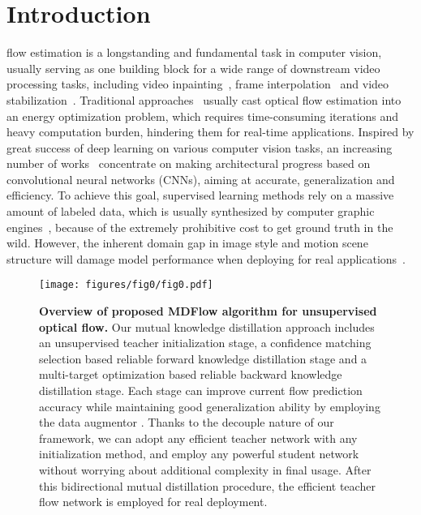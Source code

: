\documentclass[lettersize,journal]{IEEEtran}
\begin{document}
\section{Introduction}
 flow estimation is a longstanding and fundamental task in computer vision, usually serving as one building block for a wide range of downstream video processing tasks, including video inpainting~\cite{9241798}, frame interpolation~\cite{Kong_2022_CVPR,Liu_2022_ICIP} and video stabilization~\cite{7508986}. Traditional approaches~\cite{10.5555/888857,5206697,5539939,8434339} usually cast optical flow estimation into an energy optimization problem, which requires time-consuming iterations and heavy computation burden, hindering them for real-time applications. Inspired by great success of deep learning on various computer vision tasks, an increasing number of works~\cite{7410673,8099662,8579029,Hur:2019:IRR,teed2020raft,NEURIPS2020_add5aebf} concentrate on making architectural progress based on convolutional neural networks (CNNs), aiming at accurate, generalization and efficiency. To achieve this goal, supervised learning methods rely on a massive amount of labeled data, which is usually synthesized by computer graphic engines~\cite{7410673,7780807,humanflow}, because of the extremely prohibitive cost to get ground truth in the wild. However, the inherent domain gap in image style and motion scene structure will damage model performance when deploying for real applications~\cite{flowdata}.

\begin{figure}[t]
	\centering
	\vspace{2mm}
	\texttt{[image: figures/fig0/fig0.pdf]}
	\vspace{-1mm}
	\caption{\textbf{Overview of proposed MDFlow algorithm for unsupervised optical flow.} Our mutual knowledge distillation approach includes an unsupervised teacher initialization stage, a confidence matching selection based reliable forward knowledge distillation stage and a multi-target optimization based reliable backward knowledge distillation stage. Each stage can improve current flow prediction accuracy while maintaining good generalization ability by employing the data augmentor . Thanks to the decouple nature of our framework, we can adopt any efficient teacher network  with any initialization method, and employ any powerful student network  without worrying about additional complexity in final usage. After this bidirectional mutual distillation procedure, the efficient teacher flow network is employed for real deployment.}
	\label{fig:0}
	\vspace{-1mm}
\end{figure}
\end{document}
